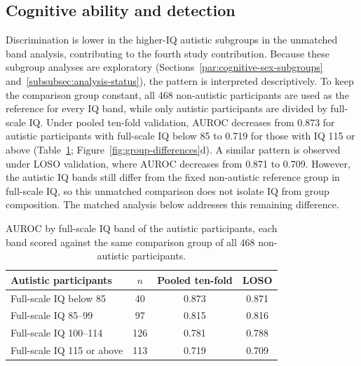 \subsection{Cognitive ability and detection}
\label{subsec:results-cognitive-ability}

Discrimination is lower in the higher-IQ autistic subgroups in the unmatched band analysis, contributing to the fourth study contribution. Because these subgroup analyses are exploratory (Sections~\ref{par:cognitive-sex-subgroups} and~\ref{subsubsec:analysis-status}), the pattern is interpreted descriptively. To keep the comparison group constant, all 468 non-autistic participants are used as the reference for every IQ band, while only autistic participants are divided by full-scale IQ. Under pooled ten-fold validation, AUROC decreases from 0.873 for autistic participants with full-scale IQ below 85 to 0.719 for those with IQ 115 or above (Table~\ref{tab:iq-bands}; Figure~\ref{fig:group-differences}d). A similar pattern is observed under LOSO validation, where AUROC decreases from 0.871 to 0.709. However, the autistic IQ bands still differ from the fixed non-autistic reference group in full-scale IQ, so this unmatched comparison does not isolate IQ from group composition. The matched analysis below addresses this remaining difference.

\begin{table}[t]
\centering
\caption{AUROC by full-scale IQ band of the autistic participants, each band scored
against the same comparison group of all 468 non-autistic participants.}
\label{tab:iq-bands}
\small
\begin{tabular}{@{}lccc@{}}
\toprule
Autistic participants & $n$ & Pooled ten-fold & LOSO \\
\midrule
Full-scale IQ below 85 & 40 & 0.873 & 0.871 \\
Full-scale IQ 85--99 & 97 & 0.815 & 0.816 \\
Full-scale IQ 100--114 & 126 & 0.781 & 0.788 \\
Full-scale IQ 115 or above & 113 & 0.719 & 0.709 \\
\bottomrule
\end{tabular}
\end{table}

